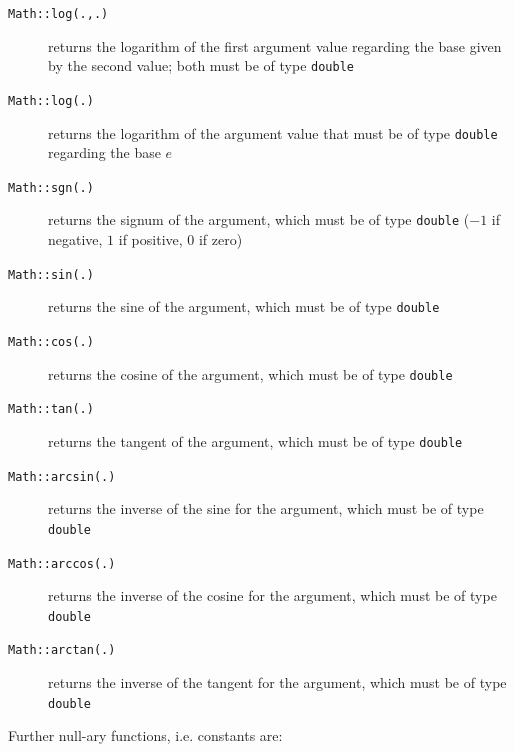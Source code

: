 \begin{description}
\item[\texttt{Math::log(.,.)}] returns the logarithm of the first argument value regarding the base given by the second value; both must be of type \texttt{double}
\item[\texttt{Math::log(.)}] returns the logarithm of the argument value that must be of type \texttt{double} regarding the base $e$
\item[\texttt{Math::sgn(.)}] returns the signum of the argument, which must be of type \texttt{double} ($-1$ if negative, $1$ if positive, $0$ if zero)
\item[\texttt{Math::sin(.)}] returns the sine of the argument, which must be of type \texttt{double}
\item[\texttt{Math::cos(.)}] returns the cosine of the argument, which must be of type \texttt{double}
\item[\texttt{Math::tan(.)}] returns the tangent of the argument, which must be of type \texttt{double}
\item[\texttt{Math::arcsin(.)}] returns the inverse of the sine for the argument, which must be of type \texttt{double}
\item[\texttt{Math::arccos(.)}] returns the inverse of the cosine for the argument, which must be of type \texttt{double}
\item[\texttt{Math::arctan(.)}] returns the inverse of the tangent for the argument, which must be of type \texttt{double}
\end{description}

\noindent Further null-ary functions, i.e. constants are:

